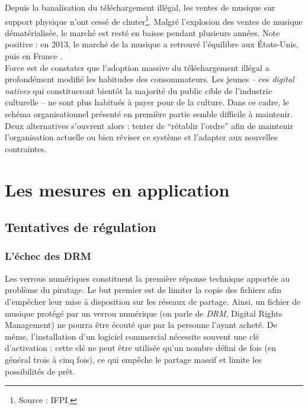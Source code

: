 \documentclass[a4paper]{report}
\begin{document}
	Depuis la banalisation du téléchargement illégal, les ventes de musique sur support physique n'ont cessé de chuter\footnote{Source : IFPI.}. Malgré l'explosion des ventes de musique dématérialisée, le marché est resté en baisse pendant plusieurs années. Note positive : en 2013, le marché de la musique a retrouvé l'équilibre aux États-Unis, puis en France \cite{marche-musical-equilibre}.\\

	Force est de constater que l'adoption massive du téléchargement illégal a profondément modifié les habitudes des consommateurs. Les jeunes – ces \emph{digital natives} qui constitueront bientôt la majorité du public cible de l'industrie culturelle – ne sont plus habitués à payer pour de la culture. Dans ce cadre, le schéma organisationnel présenté en première partie semble difficile à maintenir. Deux alternatives s'ouvrent alors : tenter de ``rétablir l'ordre'' afin de maintenir l'organisation actuelle ou bien réviser ce système et l'adapter aux nouvelles contraintes.





	\chapter{Les mesures en application}

	\section{Tentatives de régulation}

		\subsection{L'échec des DRM}
		Les verrous numériques constituent la première réponse technique apportée au problème du piratage. Le but premier est de limiter la copie des fichiers afin d'empêcher leur mise à disposition sur les réseaux de partage. Ainsi, un fichier de musique protégé par un verrou numérique (on parle de \emph{DRM}, Digital Rights Management) ne pourra être écouté que par la personne l'ayant acheté. De même, l'installation d'un logiciel commercial nécessite souvent une clé d'activation : cette clé ne peut être utilisée qu'un nombre défini de fois (en général trois à cinq fois), ce qui empêche le partage massif et limite les possibilités de prêt.\\
\end{document}
